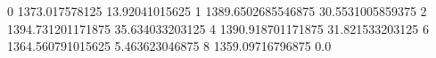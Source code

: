 0 1373.017578125 13.92041015625
1 1389.6502685546875 30.5531005859375
2 1394.731201171875 35.634033203125
4 1390.918701171875 31.821533203125
6 1364.560791015625 5.463623046875
8 1359.09716796875 0.0
